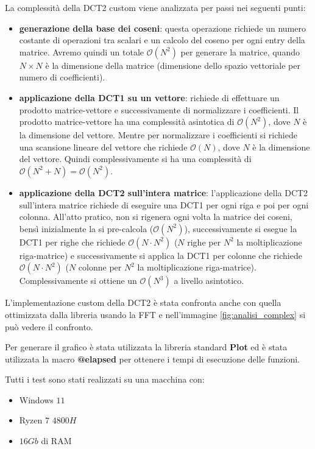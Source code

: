 La complessità della DCT2 custom viene analizzata per passi nei seguenti punti:
\begin{itemize}
    \item \textbf{generazione della base dei coseni}: questa operazione richiede
          un numero costante di operazioni tra scalari e un calcolo del coseno per ogni
          entry della matrice. Avremo quindi un totale $\mathcal{O}(N^2)$ per generare
          la matrice, quando $N\times N$ è la dimensione della matrice (dimensione dello
          spazio vettoriale per numero di coefficienti).
    \item \textbf{applicazione della DCT1 su un vettore}: richiede di effettuare un prodotto matrice-vettore e
          successivamente di normalizzare i coefficienti. Il prodotto matrice-vettore
          ha una complessità asintotica di $\mathcal{O}(N^2)$, dove $N$ è la dimensione
          del vettore. Mentre per normalizzare i coefficienti si richiede una scansione
          lineare del vettore che richiede $\mathcal{O}(N)$, dove $N$ è la dimensione
          del vettore. Quindi complessivamente si ha una complessità di $\mathcal{O}(N^2 + N) = \mathcal{O}(N^2)$.
    \item \textbf{applicazione della DCT2 sull'intera matrice}: l'applicazione della DCT2
          sull'intera matrice richiede di eseguire una DCT1 per ogni riga e poi per ogni
          colonna. All'atto pratico, non si rigenera ogni volta la matrice dei coseni,
          bensì inizialmente la si pre-calcola ($\mathcal{O}(N^2)$), successivamente si
          esegue la DCT1 per righe che richiede $\mathcal{O}(N \cdot N^2)$ ($N$ righe
          per $N^2$ la moltiplicazione riga-matrice) e successivamente si applica la
          DCT1 per colonne che richiede $\mathcal{O}(N \cdot N^2)$ ($N$ colonne
          per $N^2$ la moltiplicazione riga-matrice). Complessivamente si ottiene
          un $\mathcal{O}(N^3)$ a livello asintotico.
\end{itemize}

L'implementazione custom della DCT2 è stata confronta anche con quella ottimizzata
dalla libreria usando la FFT e nell'immagine \ref{fig:analisi_complex} si
può vedere il confronto.

Per generare il grafico è stata utilizzata la libreria standard \textbf{Plot} ed 
è stata utilizzata la macro \textbf{@elapsed} per ottenere i tempi di esecuzione 
delle funzioni.

Tutti i test sono stati realizzati su una macchina con:
\begin{itemize}
    \item Windows $11$
    \item Ryzen $7$ $4800H$
    \item $16Gb$ di RAM
\end{itemize}

